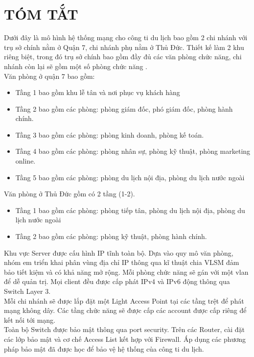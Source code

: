 \documentclass[a4paper, 12pt]{article}
\renewcommand{\figurename}{\fontsize{12pt}{0pt}\selectfont Hình}
\renewcommand{\tablename}{\fontsize{12pt}{0pt}\selectfont Bảng}
\begin{document}
{\let\oldnumberline\numberline
\renewcommand{\numberline}{\figurename~\oldnumberline}
\listoffigures} %
\cleardoublepage

{\let\oldnumberline\numberline
\renewcommand{\numberline}{\tablename~\oldnumberline}
\listoftables}%
\cleardoublepage

\section*{TÓM TẮT}
\hspace*{1cm}Dưới đây là mô hình hệ thống mạng cho công ti du lịch bao gồm 2 chi nhánh với trụ sở chính nằm ở Quận 7, chi nhánh phụ nằm ở Thủ Đức. Thiết kế làm 2 khu riêng biệt, trong đó trụ sở chính bao gồm đầy đủ các văn phòng chức năng, chi nhánh còn lại sẽ gồm một số phòng chức năng .\\
\hspace*{1cm}Văn phòng ở quận 7 bao gồm:
\begin{itemize}
\item Tầng 1 bao gồm khu lễ tân và nơi phục vụ khách hàng
\item Tầng 2 bao gồm các phòng: phòng giám đốc, phó giám đốc, phòng hành chính.
 \item Tầng 3 bao gồm các phòng: phòng kinh doanh, phòng kế toán. 
\item Tầng 4 bao gồm các phòng: phòng nhân sự, phòng kỹ thuật, phòng marketing online.
\item Tầng 5 bao gồm các phòng: phòng du lịch nội địa, phòng du lịch nước ngoài
\end{itemize}
\hspace*{1cm}Văn phòng ở Thủ Đức  gồm có 2 tầng (1-2).
\begin{itemize}
\item Tầng 1 bao gồm các phòng: phòng tiếp tân, phòng du lịch nội địa, phòng du lịch nước ngoài
\item Tầng 2 bao gồm các phòng: phòng kỹ thuật, phòng hành chính.
\end{itemize}
\hspace*{1cm}Khu vực Server được cấu hình IP tĩnh toàn bộ. Dựa vào quy mô văn phòng, nhóm em triển khai phân vùng địa chỉ IP thông qua kĩ thuật chia VLSM đảm bảo tiết kiệm và có khả năng mở rộng. Mỗi phòng chức năng sẽ gán với một vlan để dễ quản trị. Mọi client đều được cấp phát IPv4 và IPv6 động thông qua Switch Layer 3.\\
\hspace*{1cm}Mỗi chi nhánh sẽ được lắp đặt một Light Access Point tại các tầng trệt để phát mạng không dây. Các tầng chức năng sẽ được cấp các account được cấp riêng để kết nối tới mạng.\\
\hspace*{1cm}Toàn bộ Switch được bảo mật thông qua port security. Trên các Router, cài đặt các lớp bảo mật và cơ chế Access List kết hợp với Firewall. Áp dụng các phương pháp bảo mật đã được học để bảo vệ hệ thống của công ti du lịch.
\cleardoublepage
\end{document}
